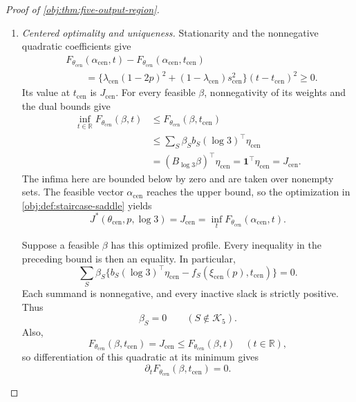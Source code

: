 \documentclass[11pt]{article}
\begin{document}
\begin{proof}[Proof of \cref{obj:thm:five-output-region}]
\begin{enumerate}
\item \textit{Centered optimality and uniqueness.}
Stationarity and the nonnegative quadratic coefficients give
\[
\begin{aligned}
&F_{\theta_{\mathrm{cen}}}(\alpha_{\mathrm{cen}},t)
-F_{\theta_{\mathrm{cen}}}(\alpha_{\mathrm{cen}},t_{\mathrm{cen}})\\
&\qquad=
\bigl\{\lambda_{\mathrm{cen}}(1-2p)^2
 +(1-\lambda_{\mathrm{cen}})s_{\mathrm{cen}}^2\bigr\}
(t-t_{\mathrm{cen}})^2\ge0.
\end{aligned}
\]
Its value at \(t_{\mathrm{cen}}\) is \(J_{\mathrm{cen}}\).
For every feasible \(\beta\), nonnegativity of its weights and the dual
bounds give
\[
\begin{aligned}
\inf_{t\in\mathbb R}F_{\theta_{\mathrm{cen}}}(\beta,t)
&\le F_{\theta_{\mathrm{cen}}}(\beta,t_{\mathrm{cen}})\\
&\le\sum_S\beta_S b_S(\log3)^\top\eta_{\mathrm{cen}}\\
&=(B_{\log3}\beta)^\top\eta_{\mathrm{cen}}
=\mathbf1^\top\eta_{\mathrm{cen}}
=J_{\mathrm{cen}}.
\end{aligned}
\]
The infima here are bounded below by zero and are taken over nonempty
sets. The feasible vector \(\alpha_{\mathrm{cen}}\) reaches the upper
bound, so the optimization in \cref{obj:def:staircase-saddle} yields
\[
J^*(\theta_{\mathrm{cen}},p,\log3)
=
J_{\mathrm{cen}}
=
\inf_tF_{\theta_{\mathrm{cen}}}(\alpha_{\mathrm{cen}},t).
\]

Suppose a feasible \(\beta\) has this optimized profile. Every inequality
in the preceding bound is then an equality. In particular,
\[
\sum_S\beta_S
\bigl\{b_S(\log3)^\top\eta_{\mathrm{cen}}
       -f_S(\xi_{\mathrm{cen}}(p),t_{\mathrm{cen}})\bigr\}=0.
\]
Each summand is nonnegative, and every inactive slack is strictly
positive. Thus
\[
\beta_S=0\qquad(S\notin\mathcal K_5).
\]
Also,
\[
F_{\theta_{\mathrm{cen}}}(\beta,t_{\mathrm{cen}})
=
J_{\mathrm{cen}}
\le F_{\theta_{\mathrm{cen}}}(\beta,t)
\quad(t\in\mathbb R),
\]
so differentiation of this quadratic at its minimum gives
\[
\partial_tF_{\theta_{\mathrm{cen}}}(\beta,t_{\mathrm{cen}})=0.
\]


\end{enumerate}
\end{proof}
\end{document}
